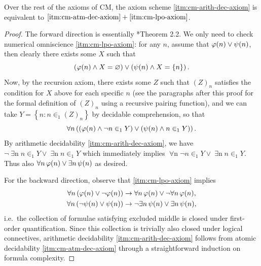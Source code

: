 \documentclass[12pt,openany]{book}
\theoremstyle{plain}
\theoremstyle{definition}
\newcommand\opA[1]{\mathop{\forall #1}}
\newcommand\opE[1]{\mathop{\exists #1}}
\begin{document}
\begin{lemma}
  \label{lem:cm-lpo}
  Over the rest of the axioms of $\mathrm{CM}$, the axiom scheme \ref{itm:cm-arith-dec-axiom} is equivalent to $\text{\ref{itm:cm-atm-dec-axiom}} + \text{\ref{itm:cm-lpo-axiom}}$.
\end{lemma}

\begin{proof}
  The forward direction is essentially \cite{weaver09-cm}*{Theorem 2.2}. We only need to check numerical omniscience \ref{itm:cm-lpo-axiom}: for any $n$, assume that $\varphi\mleft(n\mright) \lor \psi\mleft(n\mright)$, then clearly there exists some $X$ such that
  \[\left(\varphi\mleft(n\mright) \land X = \varnothing\right) \lor \left(\psi\mleft(n\mright) \land X = \left\{n\right\}\right).\]
  Now, by the recursion axiom, there exists some $Z$ such that $\left(Z\right)_n$ satisfies the condition for $X$ above for each specific $n$ (see the paragraphs after this proof for the formal definition of $\left(Z\right)_n$ using a recursive pairing function), and we can take $Y = \left\{n : n \in_1 \left(Z\right)_n\right\}$ by decidable comprehension, so that
  \[\opA{n} \left(\left(\varphi\mleft(n\mright) \land \neg n \in_1 Y\right) \lor \left(\psi\mleft(n\mright) \land n \in_1 Y\right)\right).\]
  By arithmetic decidability \ref{itm:cm-arith-dec-axiom}, we have $\neg\!\opE{n} n \in_1 Y \lor \opE{n} n \in_1 Y$ which immediately implies $\opA{n} \neg n \in_1 Y \lor \opE{n} n \in_1 Y$. Thus also $\opA{n} \varphi\mleft(n\mright) \lor \opE{n} \psi\mleft(n\mright)$ as desired.

  For the backward direction, observe that \ref{itm:cm-lpo-axiom} implies
  \begin{align*}
    \opA{n} \left(\varphi\mleft(n\mright) \lor \neg \varphi\mleft(n\mright)\right) & \rightarrow \opA{n} \varphi\mleft(n\mright) \lor \neg\!\opA{n} \varphi\mleft(n\mright), \\
    \opA{n} \left(\neg \psi\mleft(n\mright) \lor \psi\mleft(n\mright)\right)       & \rightarrow \neg\!\opE{n} \psi\mleft(n\mright) \lor \opE{n} \psi\mleft(n\mright),
  \end{align*}
  i.e.\ the collection of formulae satisfying excluded middle is closed under first-order quantification. Since this collection is trivially also closed under logical connectives, arithmetic decidability \ref{itm:cm-arith-dec-axiom} follows from atomic decidability \ref{itm:cm-atm-dec-axiom} through a straightforward induction on formula complexity.
\end{proof}
\end{document}
